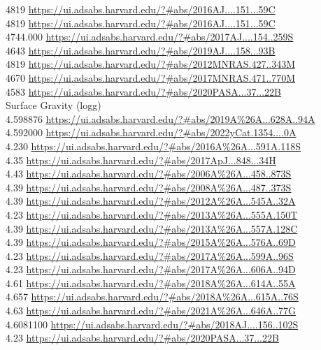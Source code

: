 4819 \url{https://ui.adsabs.harvard.edu/?#abs/2016AJ....151...59C}\\
4819 \url{https://ui.adsabs.harvard.edu/?#abs/2016AJ....151...59C}\\
4744.000 \url{https://ui.adsabs.harvard.edu/?#abs/2017AJ....154..259S}\\
4643 \url{https://ui.adsabs.harvard.edu/?#abs/2019AJ....158...93B}\\
4819 \url{https://ui.adsabs.harvard.edu/?#abs/2012MNRAS.427..343M}\\
4670 \url{https://ui.adsabs.harvard.edu/?#abs/2017MNRAS.471..770M}\\
4583 \url{https://ui.adsabs.harvard.edu/?#abs/2020PASA...37...22B}\\
Surface Gravity (logg)\\
4.598876 \url{https://ui.adsabs.harvard.edu/?#abs/2019A%26A...628A..94A}\\
4.592000 \url{https://ui.adsabs.harvard.edu/?#abs/2022yCat.1354....0A}\\
4.230 \url{https://ui.adsabs.harvard.edu/?#abs/2016A%26A...591A.118S}\\
4.35 \url{https://ui.adsabs.harvard.edu/?#abs/2017ApJ...848...34H}\\
4.43 \url{https://ui.adsabs.harvard.edu/?#abs/2006A%26A...458..873S}\\
4.39 \url{https://ui.adsabs.harvard.edu/?#abs/2008A%26A...487..373S}\\
4.39 \url{https://ui.adsabs.harvard.edu/?#abs/2012A%26A...545A..32A}\\
4.23 \url{https://ui.adsabs.harvard.edu/?#abs/2013A%26A...555A.150T}\\
4.39 \url{https://ui.adsabs.harvard.edu/?#abs/2013A%26A...557A.128C}\\
4.39 \url{https://ui.adsabs.harvard.edu/?#abs/2015A%26A...576A..69D}\\
4.23 \url{https://ui.adsabs.harvard.edu/?#abs/2017A%26A...599A..96S}\\
4.23 \url{https://ui.adsabs.harvard.edu/?#abs/2017A%26A...606A..94D}\\
4.61 \url{https://ui.adsabs.harvard.edu/?#abs/2018A%26A...614A..55A}\\
4.657 \url{https://ui.adsabs.harvard.edu/?#abs/2018A%26A...615A..76S}\\
4.63 \url{https://ui.adsabs.harvard.edu/?#abs/2021A%26A...646A..77G}\\
4.6081100 \url{https://ui.adsabs.harvard.edu/?#abs/2018AJ....156..102S}\\
4.23 \url{https://ui.adsabs.harvard.edu/?#abs/2020PASA...37...22B}\\


